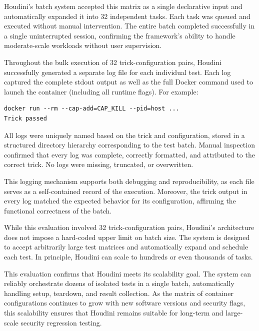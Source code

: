 \begin{doublespace}
Houdini’s batch system accepted this matrix as a single declarative input and automatically expanded it into 32 independent tasks. Each task was queued and executed without manual intervention. The entire batch completed successfully in a single uninterrupted session, confirming the framework’s ability to handle moderate-scale workloads without user supervision.

Throughout the bulk execution of 32 trick-configuration pairs, Houdini successfully generated a separate log file for each individual test. Each log captured the complete stdout output as well as the full Docker command used to launch the container (including all runtime flags). For example:

\begin{verbatim}
docker run --rm --cap-add=CAP_KILL --pid=host ...
Trick passed
\end{verbatim}

All logs were uniquely named based on the trick and configuration, stored in a structured directory hierarchy corresponding to the test batch. Manual inspection confirmed that every log was complete, correctly formatted, and attributed to the correct trick. No logs were missing, truncated, or overwritten.

This logging mechanism supports both debugging and reproducibility, as each file serves as a self-contained record of the execution. Moreover, the trick output in every log matched the expected behavior for its configuration, affirming the functional correctness of the batch.

While this evaluation involved 32 trick-configuration pairs, Houdini’s architecture does not impose a hard-coded upper limit on batch size. The system is designed to accept arbitrarily large test matrices and automatically expand and schedule each test. In principle, Houdini can scale to hundreds or even thousands of tasks.

This evaluation confirms that Houdini meets its scalability goal. The system can reliably orchestrate dozens of isolated tests in a single batch, automatically handling setup, teardown, and result collection. As the matrix of container configurations continues to grow with new software versions and security flags, this scalability ensures that Houdini remains suitable for long-term and large-scale security regression testing.

\end{doublespace}